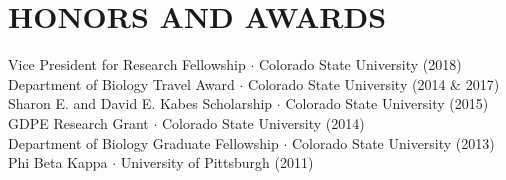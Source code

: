 \documentclass{cv}
\begin{document}






\section*{HONORS AND AWARDS}



Vice President for Research Fellowship $\cdot$ Colorado State University (2018) \\ %
Department of Biology Travel Award $\cdot$ Colorado State University (2014 \& 2017) \\ %
Sharon E. and David E. Kabes Scholarship $\cdot$ Colorado State University (2015) \\ %
GDPE Research Grant $\cdot$ Colorado State University (2014) \\ %
Department of Biology Graduate Fellowship $\cdot$ Colorado State University (2013) \\ %
Phi Beta Kappa $\cdot$ University of Pittsburgh (2011)
\end{document}
